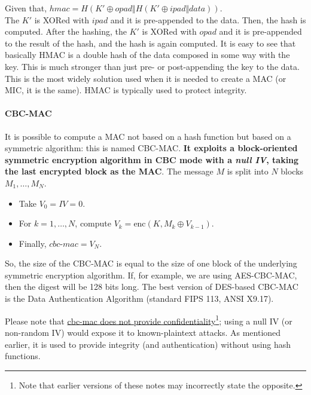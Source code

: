 Given that, \(hmac = H(K' \oplus opad \Vert H(K' \oplus ipad \Vert data))\).\\
The \(K'\) is XORed with \(ipad\) and it is pre-appended to the data. Then, the hash is computed. After the hashing, the \(K'\) is XORed with \(opad\) and it is pre-appended to the result of the hash, and the hash is again computed. It is easy to see that basically HMAC is a double hash of the data composed in some way with the key. This is much stronger than just pre- or post-appending the key to the data. This is the most widely solution used when it is needed to create a MAC (or MIC, it is the same). HMAC is typically used to protect integrity.


\paragraph{CBC-MAC}
It is possible to compute a MAC not based on a hash function but based on a symmetric algorithm: this is named CBC-MAC.
\textbf{It exploits a block-oriented symmetric encryption algorithm in CBC mode with a \emph{null IV}, taking the last encrypted block as the MAC}.
The message \(M\) is split into \(N\) blocks \(M_1, \ldots, M_N\). \begin{itemize}
    \item Take \(V_0  = \mathit{IV} = 0\).
    \item For \(k = 1, \ldots, N\), compute \(V_k = \text{enc}(K, M_k \oplus V_{k-1})\).
    \item Finally, \( \textit{cbc-mac} = V_N\).
\end{itemize}
So, the size of the CBC-MAC is equal to the size of one block of the underlying symmetric encryption algorithm. If, for example, we are using AES-CBC-MAC, then the digest will be 128 bits long. The best version of DES-based CBC-MAC is the Data Authentication Algorithm (standard FIPS 113, ANSI X9.17).

Please note that  \ul{cbc-mac does not provide confidentiality}\footnote{Note that earlier versions of these notes may incorrectly state the opposite.}; using a null IV (or non-random IV) would expose it to known-plaintext attacks. As mentioned earlier, it is used to provide integrity (and authentication) without using hash functions.

